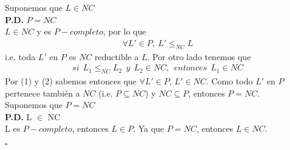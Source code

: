 \documentclass[12pt]{article}
\newcommand*{\QEDB}{\hfill\ensuremath{\square}}%
\begin{document}
\fbox{\textbf{$\Rightarrow$}} Suponemos que \textbf{$L \in NC$} \\

\textbf{P.D.} $P = NC$ \\

$L \in NC$ y es $P-completo$, por lo que
  \begin{gather}
    \forall L' \in P,\  L' \leq_{NC} L
  \end{gather}
  i.e. toda $L'$ en $P$ es $NC$ reductible a $L$. Por otro lado tenemos que
  \begin{gather}
    si\ \ L_1 \leq_{NC} L_2\ \ y\ \ L_2 \in NC,\ \ entonces\ \ L_1 \in NC    
  \end{gather}
  Por (1) y (2) sabemos entonces que $\forall L' \in P$, $L' \in NC$. Como todo $L'$ en $P$ pertenece también a $NC$ (i.e. $P \subseteq NC$) y $NC \subseteq P$, entonces $P = NC$. \\

  \fbox{\textbf{$\Leftarrow$}} Suponemos que \textbf{$P = NC$} \\

  \textbf{P.D.} L $\in$ NC \\

  L es $P-completo$, entonces $L \in P$. Ya que $P = NC$, entonces $L \in NC$.
  \begin{flushright}
    \QEDB
  \end{flushright}
\end{document}
